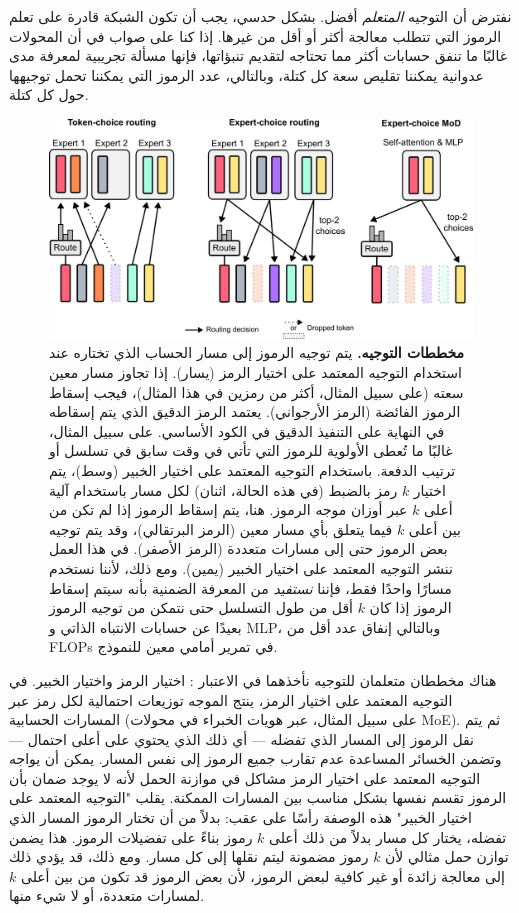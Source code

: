 \documentclass[11pt, a4paper, onecolumn, logo, copyright]{googledeepmind}
\begin{document}
نفترض أن التوجيه \emph{المتعلم} أفضل. بشكل حدسي، يجب أن تكون الشبكة قادرة على تعلم الرموز التي تتطلب معالجة أكثر أو أقل من غيرها. إذا كنا على صواب في أن المحولات غالبًا ما تنفق حسابات أكثر مما تحتاجه لتقديم تنبؤاتها، فإنها مسألة تجريبية لمعرفة مدى عدوانية يمكننا تقليص سعة كل كتلة، وبالتالي، عدد الرموز التي يمكننا تحمل توجيهها حول كل كتلة.

\begin{figure}[h]
\centering
\includegraphics{routing.png}
\caption{\textbf{مخططات التوجيه.} يتم توجيه الرموز إلى مسار الحساب الذي تختاره عند استخدام التوجيه المعتمد على اختيار الرمز (يسار). إذا تجاوز مسار معين سعته (على سبيل المثال، أكثر من رمزين في هذا المثال)، فيجب إسقاط الرموز الفائضة (الرمز الأرجواني). يعتمد الرمز الدقيق الذي يتم إسقاطه في النهاية على التنفيذ الدقيق في الكود الأساسي. على سبيل المثال، غالبًا ما تُعطى الأولوية للرموز التي تأتي في وقت سابق في تسلسل أو ترتيب الدفعة. باستخدام التوجيه المعتمد على اختيار الخبير (وسط)، يتم اختيار $k$ رمز بالضبط (في هذه الحالة، اثنان) لكل مسار باستخدام آلية أعلى $k$ عبر أوزان موجه الرموز. هنا، يتم إسقاط الرموز إذا لم تكن من بين أعلى $k$ فيما يتعلق بأي مسار معين (الرمز البرتقالي)، وقد يتم توجيه بعض الرموز حتى إلى مسارات متعددة (الرمز الأصفر). في هذا العمل ننشر التوجيه المعتمد على اختيار الخبير (يمين). ومع ذلك، لأننا نستخدم مسارًا واحدًا فقط، فإننا \emph{نستفيد} من المعرفة الضمنية بأنه سيتم إسقاط الرموز إذا كان $k$ أقل من طول التسلسل حتى نتمكن من توجيه الرموز بعيدًا عن حسابات الانتباه الذاتي و MLP، وبالتالي إنفاق عدد أقل من FLOPs في تمرير أمامي معين للنموذج.}
\label{fig:routing}
\end{figure}

هناك مخططان متعلمان للتوجيه نأخذهما في الاعتبار  : اختيار الرمز واختيار الخبير. في التوجيه المعتمد على اختيار الرمز، ينتج الموجه توزيعات احتمالية لكل رمز عبر المسارات الحسابية (على سبيل المثال، عبر هويات الخبراء في محولات MoE). ثم يتم نقل الرموز إلى المسار الذي تفضله --- أي ذلك الذي يحتوي على أعلى احتمال --- وتضمن الخسائر المساعدة عدم تقارب جميع الرموز إلى نفس المسار. يمكن أن يواجه التوجيه المعتمد على اختيار الرمز مشاكل في موازنة الحمل لأنه لا يوجد ضمان بأن الرموز تقسم نفسها بشكل مناسب بين المسارات الممكنة. يقلب "التوجيه المعتمد على اختيار الخبير" هذه الوصفة رأسًا على عقب: بدلاً من أن تختار الرموز المسار الذي تفضله، يختار كل مسار بدلاً من ذلك أعلى $k$ رموز بناءً على تفضيلات الرموز. هذا يضمن توازن حمل مثالي لأن $k$ رموز مضمونة ليتم نقلها إلى كل مسار. ومع ذلك، قد يؤدي ذلك إلى معالجة زائدة أو غير كافية لبعض الرموز، لأن بعض الرموز قد تكون من بين أعلى $k$ لمسارات متعددة، أو لا شيء منها.
\end{document}
